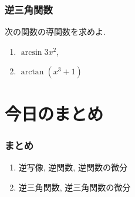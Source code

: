 

\begin{frame}
\frametitle{逆三角関数}

\begin{Prob}
次の関数の導関数を求めよ. 
\begin{enumerate}
\item $\arcsin 3x^2$, 
\item $\arctan (x^3+1)$
\end{enumerate}
\end{Prob}

\end{frame}










\section{今日のまとめ}
\begin{frame}
\frametitle{まとめ}   

\begin{enumerate}
\item 逆写像, 逆関数, 逆関数の微分
\item 逆三角関数, 逆三角関数の微分
\end{enumerate} 




\end{frame}
